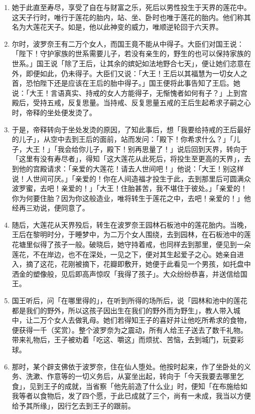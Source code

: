 \begin{enumerate}
\item 她于此直至寿尽，享受了自在与财富之乐，死后以男性投生于天界的莲花中。这天子行时，唯行于莲花的胎内，站、坐、卧时也唯于莲花的胎内。他们称其名为大莲花天子。如是，他以此神变的威力，唯顺逆轮回于六天界。
\item 尔时，波罗奈王有二万个女人，而国王竟不能从中得子。大臣们对国王说：「陛下！守护家族的世系需要儿子，若没有亲生的，野生的也可以保持家族的世系。」国王说「除了王后，让其余的嫔妃如法地野合七天」，便让她们恣意在外，即便如此，仍未得子。大臣们又说：「大王！王后以其福慧为一切女人之首，恐怕陛下还是应该在王后的胎中得子。」国王便将此事告知了王后。她说：「大王！言语真实、持戒的女人方能得子，无惭愧者如何有子？」上到宫殿后，受持五戒，反复思量。当持戒、反复思量五戒的王后生起希求子嗣之心时，帝释的坐处便发烫了。
\item 于是，帝释转向于坐处发烫的原因，了知此事后，想「我要给持戒的王后最好的儿子」，从空中去到王后的面前，站而发问：「殿下！你希求什么？」「儿子，大王！」「我会给你儿子，殿下！别再思量了！」说后回到天界，转向于「这里有没有寿尽者」，得知「这大莲花从此死后，将投生至更高的天界」，去到他的宫殿请求：「亲爱的大莲花！请去人世间吧！」他说：「大王！别这样说！人世间可厌。」「亲爱的！你在人间造福才投生于此，去到那里后可圆满众波罗蜜，去吧！亲爱的！」「大王！住胎甚苦，我不堪住于彼处。」「亲爱的！你为何要住胎？因为你这般造业，唯将转生于莲花之中，去吧！亲爱的！」他经再三劝说，便同意了。
\item 随后，大莲花从天界殁后，转生在波罗奈王园林石板池中的莲花胎内。当晚，王后在黎明时分，于睡梦中，为二万个女人围绕，去到园林，在石板池中的莲花塘里似得了孩子一般。破晓后，她守持着戒，也同样去到那里，便见到一朵莲花，不在岸边，也不在深处，一见之下，便对其生起爱子之心。她亲自进入，摘了这花，花刚被摘下，花瓣即敷开，她便于此看见一个男孩，如托盘中洒金的塑像般，见后即高声惊叹「我得了孩子」。大众纷纷恭喜，并送信给国王。
\item 国王听后，问「在哪里得的」，在听到所得的场所后，说「园林和池中的莲花都是我们的野外，所以这孩子因出生在我们的野外而为野生」，教人带入城中，让二万个女人去做乳母。她们若得知王子的喜好并让他吃所希求的食物，便获得一千（奖赏）。整个波罗奈为之震动，所有人给王子送去了数千礼物。带来礼物后，王子被劝着「吃这、嚼这」而烦扰、苦恼，去到城门，玩耍彩球。
\item 那时，某个辟支佛依于波罗奈，住在仙人堕处。他按时起来，作了坐卧处的义务、洗漱、作意等的一切义务后，从宴坐出起，转向于「今天我要去哪里乞食」，见到王子的成就，当省察「他先前造了什么业」时，便知「在布施给如我等者以食物后，发了四个愿，于此已成就了三个，尚有一未成，我当以方便给予其所缘」，因行乞去到王子的跟前。

\end{enumerate}
